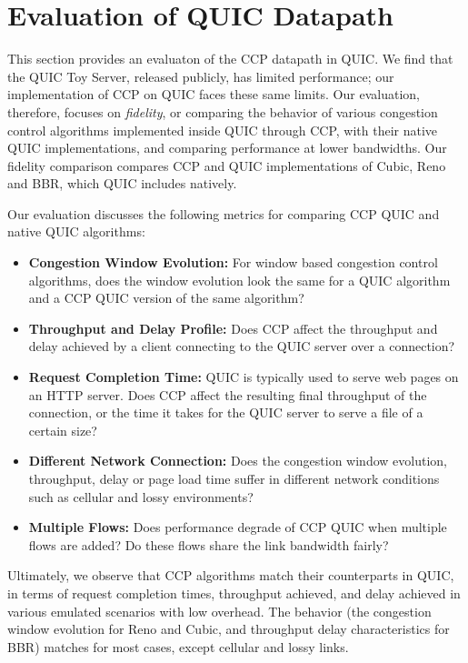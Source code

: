 \chapter{Evaluation of QUIC Datapath}
\label{sec:performance}
This section provides an evaluaton of the CCP datapath in QUIC.
We find that the QUIC Toy Server, released publicly, has limited performance; our implementation of CCP on QUIC faces these same limits.
Our evaluation, therefore, focuses on \textit{fidelity}, or comparing the behavior of various congestion control algorithms implemented inside QUIC through CCP, with their native QUIC implementations, and comparing performance at lower bandwidths.
Our fidelity comparison compares CCP and QUIC implementations of Cubic, Reno and BBR, which QUIC includes natively.

Our evaluation discusses the following metrics for comparing CCP QUIC and native QUIC algorithms:
\begin{itemize}
    \item{\textbf{Congestion Window Evolution: } For window based congestion control algorithms, does the window evolution look the same for a QUIC algorithm and  a CCP QUIC version of the same algorithm?}
    \item{\textbf{Throughput and Delay Profile: } Does CCP affect the throughput and delay achieved by a client connecting to the QUIC server over a connection?}
    \item{\textbf{Request Completion Time: } QUIC is typically used to serve web pages on an HTTP server. Does CCP affect the resulting final throughput of the connection, or the time it takes for the QUIC server to serve a file of a certain size?}
    \item{\textbf{Different Network Connection: } Does the congestion window evolution, throughput, delay or page load time suffer in different network conditions such as cellular and lossy environments?}
    \item{\textbf{Multiple Flows: } Does performance degrade of CCP QUIC when multiple flows are added? Do these flows share the link bandwidth fairly?}
\end{itemize}

Ultimately, we observe that CCP algorithms match their counterparts in QUIC, in terms of request completion times, throughput achieved, and delay achieved in various emulated scenarios with low overhead.
The behavior (the congestion window evolution for Reno and Cubic, and throughput delay characteristics for BBR) matches for most cases, except  cellular and lossy links.

